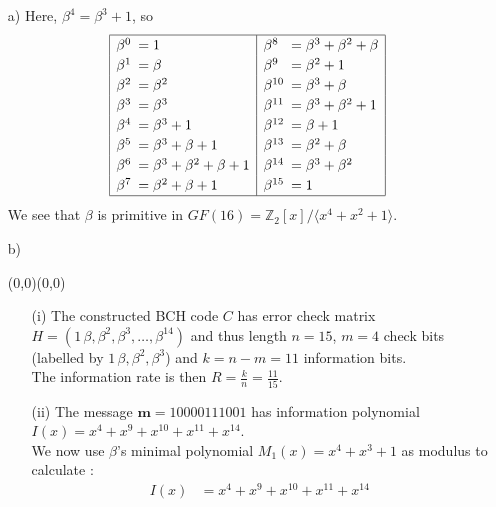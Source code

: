 \documentclass[11pt]{article}
\renewcommand{\vec}[1]{\mathbf{#1}}
\newcommand{\moveup}{\begin{picture}(0,0)(0,0)\end{picture}\vspace*{-8.15mm}}
\begin{document}
\begin{itemize}
  \item[a)] Here, $\beta^4 = \beta^3 + 1$, so
  \[{\renewcommand*{\arraystretch}{1.2}
    \begin{array}{|ll|ll|}\hline
     \beta^0 \!\!\!&= 1                             & \beta^8   \!\!\!&= \beta^3 + \beta^2 + \beta \\
     \beta^1 \!\!\!&= \beta                         & \beta^9   \!\!\!&= \beta^2 + 1\\
     \beta^2 \!\!\!&= \beta^2                       & \beta^{10}\!\!\!&= \beta^3 + \beta\\
     \beta^3 \!\!\!&= \beta^3                       & \beta^{11}\!\!\!&= \beta^3 + \beta^2 + 1\\
    \beta^4 \!\!\!&= \beta^3 + 1                   & \beta^{12}\!\!\!&= \beta   + 1\\
    \beta^5 \!\!\!&= \beta^3 + \beta + 1           & \beta^{13}\!\!\!&= \beta^2 + \beta\\
    \beta^6 \!\!\!&= \beta^3 + \beta^2 + \beta + 1 & \beta^{14}\!\!\!&= \beta^3 + \beta^2\\
    \beta^7 \!\!\!&= \beta^2 + \beta + 1           & \beta^{15}\!\!\!&= 1\\\hline
  \end{array}}\]
  We see that $\beta$ is primitive in $GF(16) = \mathbb{Z}_2[x]/\langle x^4+x^2+1\rangle$.
  \item[b)]\moveup
    \begin{itemize}
      \item[(i)]   The constructed BCH code $C$ has
                   error check matrix $H = (1\,\beta,\beta^2,\beta^3,\ldots,\beta^{14})$
                   and thus length $n = 15$, $m = 4$ check bits (labelled by $1\,\beta,\beta^2,\beta^3$)
                   and $k = n - m = 11$ information bits.\\
                   The information rate is then $R = \frac{k}{n} = \frac{11}{15}$.
      \item[(ii)]  The message $\vec{m} = \text{10000111001}$ has
                   information polynomial $I(x) = x^4 + x^9 + x^{10} + x^{11} + x^{14}$.\\
                   We now use $\beta$'s minimal polynomial $M_1(x) = x^4 + x^3 + 1$ as modulus
                   to calculate :
                   \begin{align*}
                     I(x) &= x^4 + x^9 + x^{10} + x^{11} + x^{14}\\

\end{align*}
\end{itemize}
\end{itemize}
\end{document}
